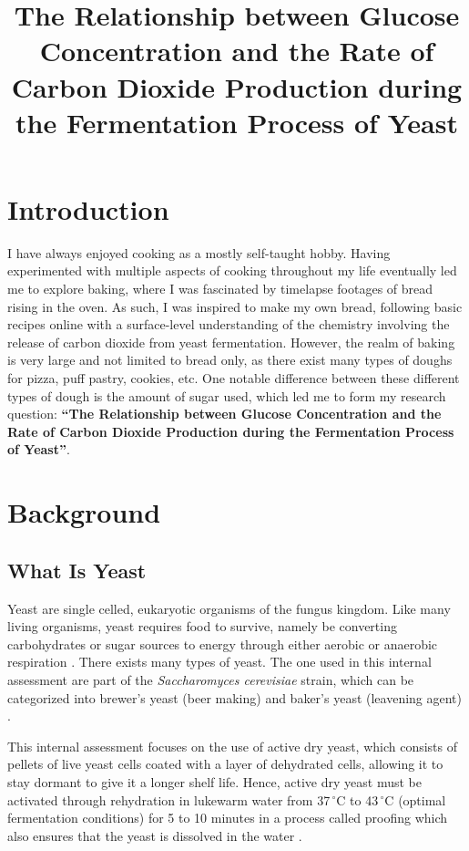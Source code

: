 \documentclass{article}
\title{\textbf{The Relationship between Glucose Concentration and the Rate of Carbon Dioxide Production during the Fermentation Process of Yeast}}
\author{}
\date{}
\begin{document}
\maketitle
\newpage
{}

\section{Introduction}
I have always enjoyed cooking as a mostly self-taught hobby. Having experimented with multiple aspects of cooking throughout my life eventually led me to explore baking, where I was fascinated by timelapse footages of bread rising in the oven. As such, I was inspired to make my own bread, following basic recipes online with a surface-level understanding of the chemistry involving the release of carbon dioxide from yeast fermentation. However, the realm of baking is very large and not limited to bread only, as there exist many types of doughs for pizza, puff pastry, cookies, etc. One notable difference between these different types of dough is the amount of sugar used, which led me to form my research question: \textbf{``The Relationship between Glucose Concentration and the Rate of Carbon Dioxide Production during the Fermentation Process of Yeast''}.

\section{Background}

\subsection{What Is Yeast}
Yeast are single celled, eukaryotic organisms of the fungus kingdom. Like many living organisms, yeast requires food to survive, namely be converting carbohydrates or sugar sources to energy through either aerobic or anaerobic respiration \parencite{ref}. There exists many types of yeast. The one used in this internal assessment are part of the \emph{Saccharomyces cerevisiae} strain, which can be categorized into brewer's yeast (beer making) and baker's yeast (leavening agent) \parencite{ref}.

\medskip

This internal assessment focuses on the use of active dry yeast, which consists of pellets of live yeast cells coated with a layer of dehydrated cells, \parencite{ref} allowing it to stay dormant to give it a longer shelf life. Hence, active dry yeast must be activated through rehydration in lukewarm water from 37$\,^{\circ}$C to 43$\,^{\circ}$C (optimal fermentation conditions) for 5 to 10 minutes in a process called proofing which also ensures that the yeast is dissolved in the water \parencite{ref}.
\end{document}
